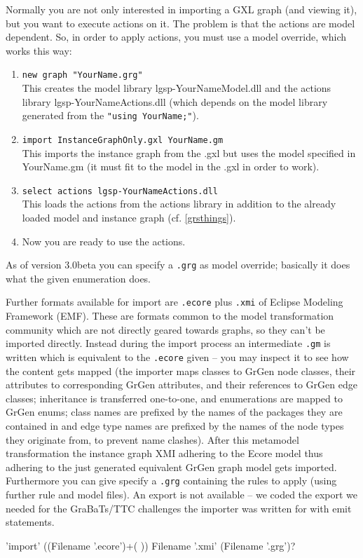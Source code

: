 \begin{note}\label{shellgxlimport}
Normally you are not only interested in importing a GXL graph (and viewing it), but you want to execute actions on it.
The problem is that the actions are model dependent.
So, in order to apply actions, you must use a model override, which works this way:
\begin{enumerate}
\item \texttt{new graph "YourName.grg"}\\
This creates the model library lgsp-YourNameModel.dll
and the actions library lgsp-YourNameActions.dll
(which depends on the model library generated from the \texttt{"using YourName;"}).
\item \texttt{import InstanceGraphOnly.gxl YourName.gm}\\
This imports the instance graph from the .gxl but uses the model specified
in YourName.gm (it must fit to the model in the .gxl in order to work).
\item \texttt{select actions lgsp-YourNameActions.dll}\\
This loads the actions from the actions library in addition to the already
loaded model and instance graph (cf. \ref{grsthings}).
\item Now you are ready to use the actions.
\end{enumerate}
As of version 3.0beta you can specify a \texttt{.grg} as model override;
basically it does what the given enumeration does.
\end{note}

\begin{note}\label{shellecoreexport}
Further formats available for import are \texttt{.ecore} plus \texttt{.xmi} of Eclipse Modeling Framework (EMF).
These are formats common to the model transformation community which are not directly geared towards graphs, so they can't be imported directly.
Instead during the import process an intermediate \texttt{.gm} is written which is equivalent to the \texttt{.ecore} given -- you may inspect it to see how the content gets mapped
(the importer maps classes to GrGen node classes, their attributes
to corresponding GrGen attributes, and their references to GrGen
edge classes; inheritance is transferred one-to-one, and enumerations are
mapped to GrGen enums; 
class names are prefixed by the names of the packages they are contained in
and edge type names are prefixed by the names of the node types they originate from,
to prevent name clashes).
After this metamodel transformation the instance graph XMI adhering to the Ecore model thus adhering to the just
generated equivalent GrGen graph model gets imported.
Furthermore you can give specify a \texttt{.grg} containing the rules to apply (using further rule and model files).
An export is not available -- we coded the export we needed for the GraBaTs/TTC challenges the importer was written for with emit statements.
\begin{rail}
  'import' ((Filename '.ecore')+( )) Filename '.xmi' (Filename '.grg')?
\end{rail}
\end{note}

